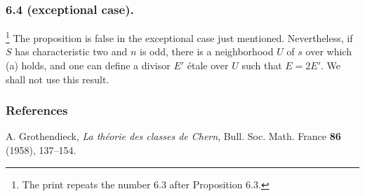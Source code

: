 \subsubsection*{6.4 (exceptional case).}
\footnote{The print repeats the number 6.3 after Proposition 6.3.}
The proposition is false in the exceptional case just mentioned.
Nevertheless, if $S$ has characteristic two and $n$ is odd, there is
a neighborhood $U$ of $s$ over which (a) holds, and one can define a
divisor $E'$ étale over $U$ such that $E=2E'$.  We shall not use this
result.

\subsubsection*{References}

\noindent[1] A. Grothendieck, \emph{La théorie des classes de Chern},
Bull. Soc. Math. France \textbf{86} (1958), 137--154.

